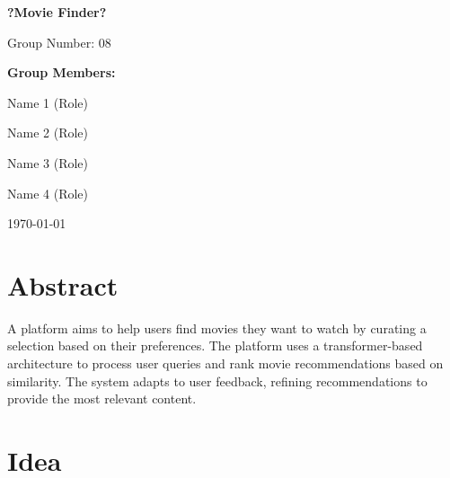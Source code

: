 \documentclass[11pt,a4paper]{article}
\begin{document}
  \begin{titlepage}
    \begin{center}
      \vspace*{2cm}
      {\huge\bfseries ?Movie Finder?\par}
      \vspace{2cm}
      {\Large Group Number: 08\par}
      \vspace{1.5cm}
      {\large\bfseries Group Members:\par}
      \vspace{0.5cm}
      {\large
      Name 1 (Role)\par
      Name 2 (Role)\par
      Name 3 (Role)\par
      Name 4 (Role)\par
      }
      \vfill
      {\large \today\par}
    \end{center}
  \end{titlepage}

  \tableofcontents
  \newpage

  \section{Abstract}

  A platform aims to help users find movies they want to watch by curating a selection based on their preferences.
  The platform uses a transformer-based architecture to process user queries and rank movie recommendations based on similarity.
  The system adapts to user feedback, refining recommendations to provide the most relevant content.

  \section{Idea}
\end{document}
